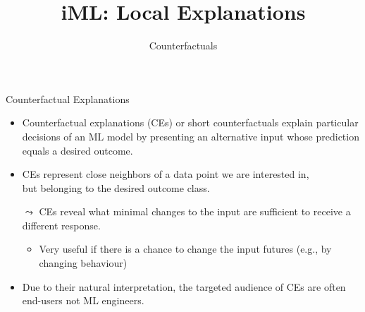 \documentclass[aspectratio=169]{../latex_main/tntbeamer}  %
\title[Introduction]{iML: Local Explanations}
\subtitle{Counterfactuals}
\begin{document}
	
	\maketitle



\begin{frame}{Counterfactual Explanations}
	\begin{itemize}
	    \item \alert{Counterfactual explanations} (CEs) or short \alert{counterfactuals} explain particular decisions of an ML model by presenting an alternative input whose prediction equals a desired outcome.
	    \smallskip \pause
		\item CEs represent \alert{close neighbors} of a data point we are interested in,\\ but belonging to the \alert{desired outcome class}. 
		\smallskip \pause
		\item[$\leadsto$] CEs reveal what minimal changes to the input are sufficient to receive a different response.
		\begin{itemize}
		    \item Very useful if there is a chance to change the input futures (e.g., by changing behaviour)
		\end{itemize}
		\smallskip \pause
		\item Due to their natural interpretation, the targeted audience of CEs are often end-users not ML engineers.
	\end{itemize}
\end{frame}
\end{document}
